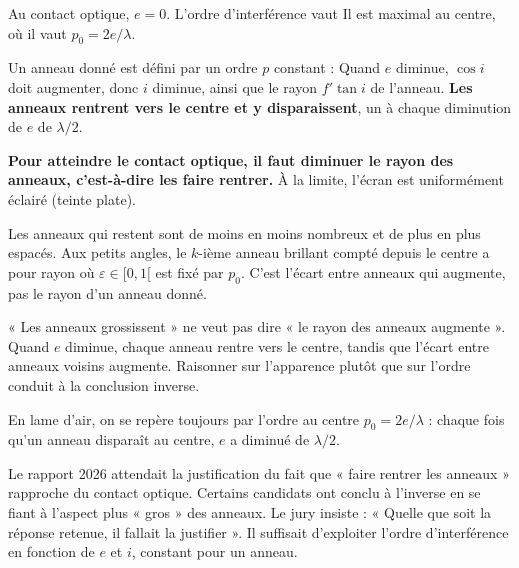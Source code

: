 \documentclass[11pt,a4paper]{article}
\newcommand{\equationajustee}[1]{%
  \sbox{\boiteequation}{$\displaystyle #1$}%
  \ifdim\wd\boiteequation>\linewidth
    \[\resizebox{\linewidth}{!}{\usebox{\boiteequation}}\]%
  \else
    \[#1\]%
  \fi}
\begin{document}
Au contact optique, \(e=0\). L'ordre d'interférence vaut
\equationajustee{p(i)=\frac{2e\cos i}{\lambda} .}
Il est maximal au centre, où il vaut \(p_0=2e/\lambda\).

Un anneau donné est défini par un ordre \(p\) constant :
\equationajustee{\cos i=\frac{p\lambda}{2e} .}
Quand \(e\) diminue, \(\cos i\) doit augmenter, donc \(i\) diminue, ainsi que le rayon \(f'\tan i\) de l'anneau. \textbf{Les anneaux rentrent vers le centre et y disparaissent}, un à chaque diminution de \(e\) de \(\lambda/2\).

\textbf{Pour atteindre le contact optique, il faut diminuer le rayon des anneaux, c'est-à-dire les faire rentrer.} À la limite, l'écran est uniformément éclairé (teinte plate).

Les anneaux qui restent sont de moins en moins nombreux et de plus en plus espacés. Aux petits angles, le \(k\)-ième anneau brillant compté depuis le centre a pour rayon
\equationajustee{\rho_k\simeq f'\sqrt{\frac{(k-\varepsilon)\lambda}{e}}\propto e^{-1/2} ,}
où \(\varepsilon\in[0,1[\) est fixé par \(p_0\). C'est l'écart entre anneaux qui augmente, pas le rayon d'un anneau donné.

\begin{piege}

« Les anneaux grossissent » ne veut pas dire « le rayon des anneaux augmente ». Quand \(e\) diminue, chaque anneau rentre vers le centre, tandis que l'écart entre anneaux voisins augmente. Raisonner sur l'apparence plutôt que sur l'ordre conduit à la conclusion inverse.

\end{piege}

\begin{methode}

En lame d'air, on se repère toujours par l'ordre au centre \(p_0=2e/\lambda\) : chaque fois qu'un anneau disparaît au centre, \(e\) a diminué de \(\lambda/2\).

\end{methode}

\begin{jury}

Le rapport 2026 attendait la justification du fait que « faire rentrer les anneaux » rapproche du contact optique. Certains candidats ont conclu à l'inverse en se fiant à l'aspect plus « gros » des anneaux. Le jury insiste : « Quelle que soit la réponse retenue, il fallait la justifier ». Il suffisait d'exploiter l'ordre d'interférence en fonction de \(e\) et \(i\), constant pour un anneau.

\end{jury}
\end{document}
